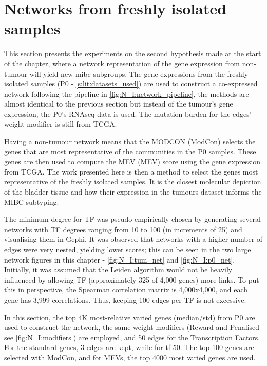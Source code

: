 \section{Networks from freshly isolated samples} \label{s:p0}

This section presents the experiments on the second hypothesis made at the start of the chapter, where a network representation of the gene expression from non-tumour will yield new \acrlong{mibc} subgroups. The gene expressions from the freshly isolated samples (P0 - \cref{s:lit:datasets_used}) are used to construct a co-expressed network following the pipeline in \cref{fig:N_I:network_pipeline}, the methods are almost identical to the previous section but instead of the tumour's gene expression, the P0's RNAseq data is used. The mutation burden for the edges' weight modifier is still from TCGA. 

Having a non-tumour network means that the \gls{MODCON} (ModCon) selects the genes that are most representative of the communities in the P0 samples. These genes are then used to compute the \gls{MEV} (MEV) score using the gene expression from TCGA. The work presented here is then a method to select the genes most representative of the freshly isolated samples. It is the closest molecular depiction of the bladder tissue and how their expression in the tumours dataset informs the MIBC subtyping.

The minimum degree for TF was pseudo-empirically chosen by generating several networks with TF degrees ranging from 10 to 100 (in increments of 25) and visualising them in Gephi. It was observed that networks with a higher number of edges were very nested, yielding lower scores; this can be seen in the two large network figures in this chapter - \cref{fig:N_I:tum_net} and \cref{fig:N_I:p0_net}. Initially, it was assumed that the Leiden algorithm would not be heavily influenced by allowing TF (approximately 325 of 4,000 genes) more links. To put this in perspective, the Spearman correlation matrix is 4,000x4,000, and each gene has 3,999 correlations. Thus, keeping 100 edges per TF is not excessive.

In this section, the top 4K most-relative varied genes (median/std) from P0 are used to construct the network, the same weight modifiers (Reward and Penalised see \cref{fig:N_I:modifiers}) are employed, and 50 edges for the Transcription Factors. For the standard genes, 3 edges are kept, while for \acrlong{tf} 50. The top 100 genes are selected with ModCon, and for MEVs, the top 4000 most varied genes are used.

